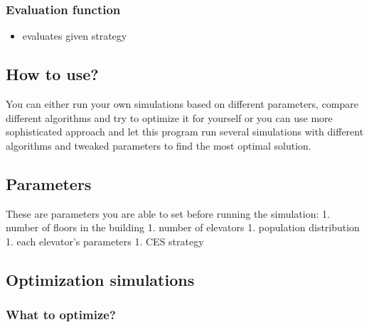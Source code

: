 \hypertarget{evaluation-function}{%
\subsubsection{\texorpdfstring{\textbf{Evaluation
function}}{Evaluation function}}\label{evaluation-function}}

\begin{itemize}
\tightlist
\item
  evaluates given strategy
\end{itemize}

\hypertarget{how-to-use}{%
\subsection{How to use?}\label{how-to-use}}

You can either run your own simulations based on different parameters,
compare different algorithms and try to optimize it for yourself or you
can use more sophisticated approach and let this program run several
simulations with different algorithms and tweaked parameters to find the
most optimal solution.

\hypertarget{parameters}{%
\subsection{Parameters}\label{parameters}}

These are parameters you are able to set before running the simulation:
1. number of floors in the building 1. number of elevators 1. population
distribution 1. each elevator's parameters 1. CES strategy

\hypertarget{optimization-simulations}{%
\subsection{Optimization simulations}\label{optimization-simulations}}

\hypertarget{what-to-optimize}{%
\subsubsection{What to optimize?}\label{what-to-optimize}}

